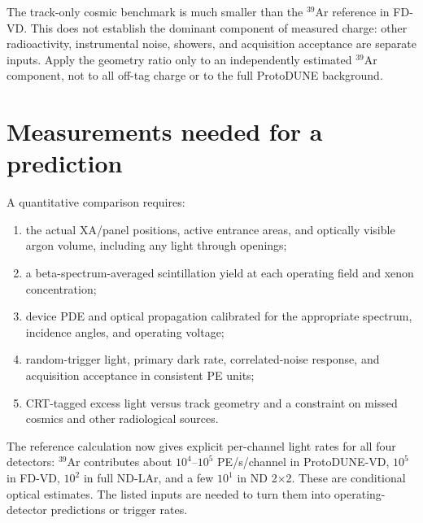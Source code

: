 \documentclass[11pt]{article}
\begin{document}
The track-only cosmic benchmark is much smaller than the $^{39}$Ar reference
in FD-VD. This does not establish the dominant component of measured charge:
other radioactivity, instrumental noise, showers, and acquisition acceptance
are separate inputs. Apply the geometry ratio
only to an independently estimated $^{39}$Ar component, not to all off-tag
charge or to the full ProtoDUNE background.



\clearpage
\section{Measurements needed for a prediction}

A quantitative comparison requires:
\begin{enumerate}
    \item the actual XA/panel positions, active entrance areas, and optically
    visible argon volume, including any light through openings;
    \item a beta-spectrum-averaged scintillation yield at each operating
    field and xenon concentration;
    \item device PDE and optical propagation calibrated for the appropriate
    spectrum, incidence angles, and operating voltage;
    \item random-trigger light, primary dark rate, correlated-noise response,
    and acquisition acceptance in consistent PE units;
    \item CRT-tagged excess light versus track geometry and a constraint on
    missed cosmics and other radiological sources.
\end{enumerate}
The reference calculation now gives explicit per-channel light rates for
all four detectors: $^{39}$Ar contributes about $10^4$--$10^5$ PE/s/channel
in ProtoDUNE-VD, $10^5$ in FD-VD, $10^2$ in full ND-LAr, and a few $10^1$
in ND 2$\times$2. These are conditional optical estimates. The listed inputs
are needed to turn them into operating-detector predictions or trigger rates.
\end{document}
